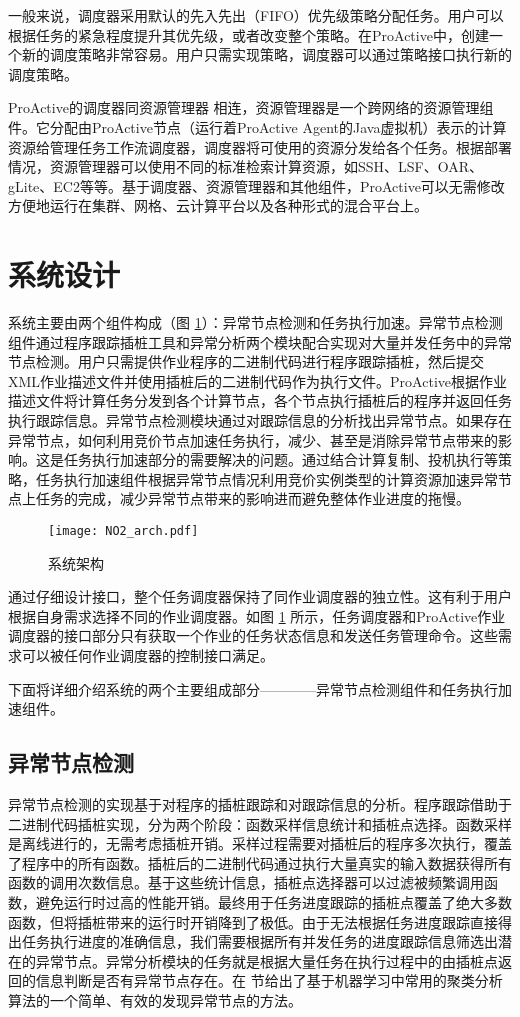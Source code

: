 一般来说，调度器采用默认的先入先出（FIFO）优先级策略分配任务。用户可以根据任务的紧急程度提升其优先级，或者改变整个策略。在ProActive中，创建一个新的调度策略非常容易。用户只需实现策略，调度器可以通过策略接口执行新的调度策略。

ProActive的调度器同资源管理器 \cite{parm} 相连，资源管理器是一个跨网络的资源管理组件。它分配由ProActive节点（运行着ProActive Agent的Java虚拟机）表示的计算资源给管理任务工作流调度器，调度器将可使用的资源分发给各个任务。根据部署情况，资源管理器可以使用不同的标准检索计算资源，如SSH、LSF、OAR、gLite、EC2等等。基于调度器、资源管理器和其他组件，ProActive可以无需修改方便地运行在集群、网格、云计算平台以及各种形式的混合平台上。

\section{系统设计}
\label{sec:no2}
系统主要由两个组件构成（图 \ref{figure:no2arch}）：异常节点检测和任务执行加速。异常节点检测组件通过程序跟踪插桩工具和异常分析两个模块配合实现对大量并发任务中的异常节点检测。用户只需提供作业程序的二进制代码进行程序跟踪插桩，然后提交XML作业描述文件并使用插桩后的二进制代码作为执行文件。ProActive根据作业描述文件将计算任务分发到各个计算节点，各个节点执行插桩后的程序并返回任务执行跟踪信息。异常节点检测模块通过对跟踪信息的分析找出异常节点。如果存在异常节点，如何利用竞价节点加速任务执行，减少、甚至是消除异常节点带来的影响。这是任务执行加速部分的需要解决的问题。通过结合计算复制、投机执行等策略，任务执行加速组件根据异常节点情况利用竞价实例类型的计算资源加速异常节点上任务的完成，减少异常节点带来的影响进而避免整体作业进度的拖慢。
\begin{figure}
  \centering
  \texttt{[image: NO2\_arch.pdf]}
  \caption{系统架构}
  \label{figure:no2arch}
\end{figure}

通过仔细设计接口，整个任务调度器保持了同作业调度器的独立性。这有利于用户根据自身需求选择不同的作业调度器。如图 \ref{figure:no2arch} 所示，任务调度器和ProActive作业调度器的接口部分只有获取一个作业的任务状态信息和发送任务管理命令。这些需求可以被任何作业调度器的控制接口满足。

下面将详细介绍系统的两个主要组成部分————异常节点检测组件和任务执行加速组件。

\subsection{异常节点检测}
\label{subsec:no2_trace}
异常节点检测的实现基于对程序的插桩跟踪和对跟踪信息的分析。程序跟踪借助于二进制代码插桩实现，分为两个阶段：函数采样信息统计和插桩点选择。函数采样是离线进行的，无需考虑插桩开销。采样过程需要对插桩后的程序多次执行，覆盖了程序中的所有函数。插桩后的二进制代码通过执行大量真实的输入数据获得所有函数的调用次数信息。基于这些统计信息，插桩点选择器可以过滤被频繁调用函数，避免运行时过高的性能开销。最终用于任务进度跟踪的插桩点覆盖了绝大多数函数，但将插桩带来的运行时开销降到了极低。由于无法根据任务进度跟踪直接得出任务执行进度的准确信息，我们需要根据所有并发任务的进度跟踪信息筛选出潜在的异常节点。异常分析模块的任务就是根据大量任务在执行过程中的由插桩点返回的信息判断是否有异常节点存在。在 \label{subsec:no2_clustering} 节给出了基于机器学习中常用的聚类分析算法的一个简单、有效的发现异常节点的方法。

